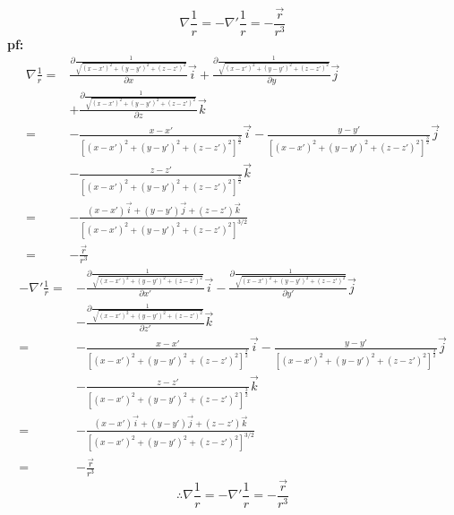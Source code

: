 \documentclass[10pt,a4paper]{article}
\begin{document}
\subsection{}
\[
\nabla\frac{1}{r}=-\nabla'\frac{1}{r}=-\frac{\vec{r}}{r^3}
\]
\textbf{pf:}
\footnotesize\begin{align*}
\nabla\frac{1}{r}=&\frac{\partial\frac{1}{\sqrt{(x-x')^2+(y-y')^2+(z-z')^2}}}{\partial x}\vec{i}+\frac{\partial\frac{1}{\sqrt{(x-x')^2+(y-y')^2+(z-z')^2}}}{\partial y}\vec{j}\\
&+\frac{\partial\frac{1}{\sqrt{(x-x')^2+(y-y')^2+(z-z')^2}}}{\partial z}\vec{k}\\
=&-\frac{x-x'}{[(x-x')^2+(y-y')^2+(z-z')^2]^{\frac{3}{2}}}\vec{i}-\frac{y-y'}{[(x-x')^2+(y-y')^2+(z-z')^2]^{\frac{3}{2}}}\vec{j}\\
&-\frac{z-z'}{[(x-x')^2+(y-y')^2+(z-z')^2]^{\frac{3}{2}}}\vec{k}\\
=&-\frac{(x-x')\vec{i}+(y-y')\vec{j}+(z-z')\vec{k}}{[(x-x')^2+(y-y')^2+(z-z')^2]^{3/2}}\\
=&-\frac{\vec{r}}{r^3}
\end{align*}
\begin{align*}
-\nabla'\frac{1}{r}=&-\frac{\partial\frac{1}{\sqrt{(x-x')^2+(y-y')^2+(z-z')^2}}}{\partial x'}\vec{i}-\frac{\partial\frac{1}{\sqrt{(x-x')^2+(y-y')^2+(z-z')^2}}}{\partial y'}\vec{j}\\
&-\frac{\partial\frac{1}{\sqrt{(x-x')^2+(y-y')^2+(z-z')^2}}}{\partial z'}\vec{k}\\
=&-\frac{x-x'}{[(x-x')^2+(y-y')^2+(z-z')^2]^{\frac{3}{2}}}\vec{i}-\frac{y-y'}{[(x-x')^2+(y-y')^2+(z-z')^2]^{\frac{3}{2}}}\vec{j}\\
&-\frac{z-z'}{[(x-x')^2+(y-y')^2+(z-z')^2]^{\frac{3}{2}}}\vec{k}\\
=&-\frac{(x-x')\vec{i}+(y-y')\vec{j}+(z-z')\vec{k}}{[(x-x')^2+(y-y')^2+(z-z')^2]^{3/2}}\\
=&-\frac{\vec{r}}{r^3}
\end{align*}\normalsize
\[
\therefore\nabla\frac{1}{r}=-\nabla'\frac{1}{r}=-\frac{\vec{r}}{r^3}
\]
\end{document}
